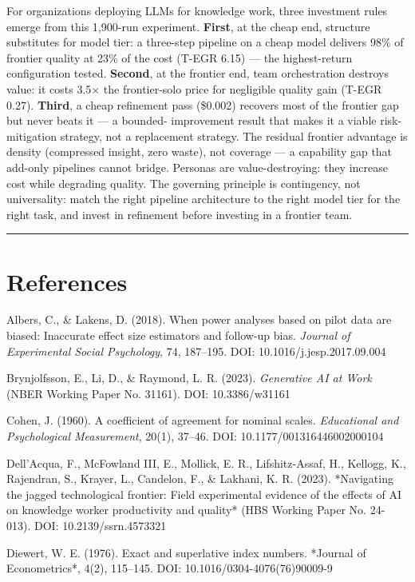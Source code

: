 \documentclass[11pt,a4paper]{article}
\begin{document}
For organizations deploying LLMs for knowledge work, three investment
rules emerge from this 1,900-run experiment. \textbf{First}, at the cheap end,
structure substitutes for model tier: a three-step pipeline on a cheap model
delivers 98\% of frontier quality at 23\% of the cost (T-EGR 6.15) — the
highest-return configuration tested. \textbf{Second}, at the frontier end, team
orchestration destroys value: it costs 3.5× the frontier-solo price for
negligible quality gain (T-EGR 0.27). \textbf{Third}, a cheap refinement pass
(\$0.002) recovers most of the frontier gap but never beats it — a bounded-
improvement result that makes it a viable risk-mitigation strategy, not a
replacement strategy. The residual frontier advantage is density (compressed
insight, zero waste), not coverage — a capability gap that add-only pipelines
cannot bridge. Personas are value-destroying: they increase cost while
degrading quality. The governing principle is contingency, not universality:
match the right pipeline architecture to the right model tier for the right
task, and invest in refinement before investing in a frontier team.

\hrule


\section{References}

Albers, C., \& Lakens, D. (2018). When power analyses based on pilot data
are biased: Inaccurate effect size estimators and follow-up bias.
\textit{Journal of Experimental Social Psychology}, 74, 187–195.
DOI: 10.1016/j.jesp.2017.09.004

Brynjolfsson, E., Li, D., \& Raymond, L. R. (2023). \textit{Generative AI at Work}
(NBER Working Paper No. 31161). DOI: 10.3386/w31161

Cohen, J. (1960). A coefficient of agreement for nominal scales.
\textit{Educational and Psychological Measurement}, 20(1), 37–46.
DOI: 10.1177/001316446002000104

Dell'Acqua, F., McFowland III, E., Mollick, E. R., Lifshitz-Assaf, H.,
Kellogg, K., Rajendran, S., Krayer, L., Candelon, F., \& Lakhani, K. R.
(2023). *Navigating the jagged technological frontier: Field experimental
evidence of the effects of AI on knowledge worker productivity and quality*
(HBS Working Paper No. 24-013). DOI: 10.2139/ssrn.4573321

Diewert, W. E. (1976). Exact and superlative index numbers. *Journal of
Econometrics*, 4(2), 115–145. DOI: 10.1016/0304-4076(76)90009-9
\end{document}
